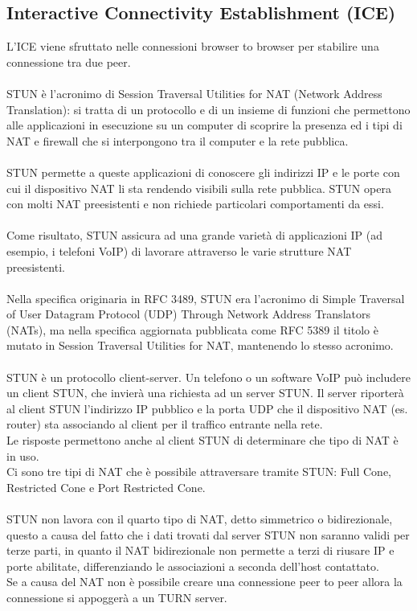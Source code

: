 \documentclass[11pt, a4paper, titlepage, block]{article}
\begin{document}
	\subsection{Interactive Connectivity Establishment (ICE)}
L'ICE viene sfruttato nelle connessioni browser to browser per stabilire una connessione tra due peer. \\
\\
STUN \`e l'acronimo di Session Traversal Utilities for NAT (Network Address Translation): si tratta di un protocollo e di un insieme di funzioni che permettono alle applicazioni in esecuzione su un computer di scoprire la presenza ed i tipi di NAT e firewall che si interpongono tra il computer e la rete pubblica.\\
\\
STUN permette a queste applicazioni di conoscere gli indirizzi IP e le porte con cui il dispositivo NAT li sta rendendo visibili sulla rete pubblica. STUN opera con molti NAT preesistenti e non richiede particolari comportamenti da essi.\\
\\
Come risultato, STUN assicura ad una grande variet\`a di applicazioni IP (ad esempio, i telefoni VoIP) di lavorare attraverso le varie strutture NAT preesistenti.\\
\\
Nella specifica originaria in RFC 3489, STUN era l'acronimo di Simple Traversal of User Datagram Protocol (UDP) Through Network Address Translators (NATs), ma nella specifica aggiornata pubblicata come RFC 5389 il titolo \`e mutato in Session Traversal Utilities for NAT, mantenendo lo stesso acronimo.\\
\\
STUN \`e un protocollo client-server. Un telefono o un software VoIP pu\`o includere un client STUN, che invier\`a una richiesta ad un server STUN. Il server riporter\`a al client STUN l'indirizzo IP pubblico e la porta UDP che il dispositivo NAT (es. router) sta associando al client per il traffico entrante nella rete.\\
Le risposte permettono anche al client STUN di determinare che tipo di NAT \`e in uso.\\
Ci sono tre tipi di NAT che \`e possibile attraversare tramite STUN: Full Cone, Restricted Cone e Port Restricted Cone.\\
\\
STUN non lavora con il quarto tipo di NAT, detto simmetrico o bidirezionale, questo a causa del fatto che i dati trovati dal server STUN non saranno validi per terze parti, in quanto il NAT bidirezionale non permette a terzi di riusare IP e porte abilitate, differenziando le associazioni a seconda dell'host contattato.\\
Se a causa del NAT non \`e possibile creare una connessione peer to peer allora la connessione si appogger\`a a un TURN server.\\
\end{document}

